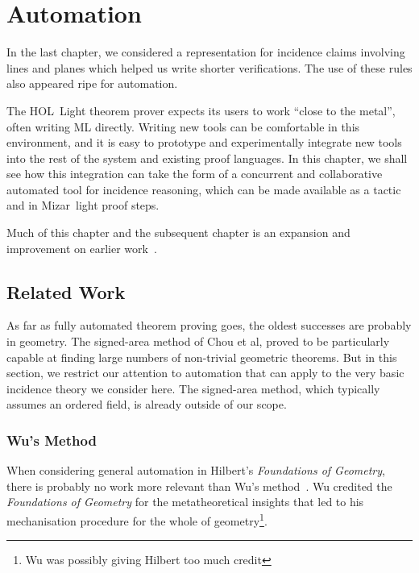 \chapter{Automation}\label{chapter:Automation}
In the last chapter, we considered a representation for incidence claims involving lines and planes which helped us write shorter verifications. The use of these rules also appeared ripe for automation. 

The HOL~Light theorem prover expects its users to work ``close to the metal'', often writing ML directly. Writing new tools can be comfortable in this environment, and it is easy to prototype and experimentally integrate new tools into the rest of the system and existing proof languages. In this chapter, we shall see how this integration can take the form of a concurrent and collaborative automated tool for incidence reasoning, which can be made available as a tactic and in Mizar~light proof steps.

Much of this chapter and the subsequent chapter is an expansion and improvement on earlier work~\cite{ScottExploring,ScottComposable}.

\section{Related Work}
As far as fully automated theorem proving goes, the oldest successes are probably in geometry. The signed-area method \cite{MachineProofsInGeometry} of Chou et al, proved to be particularly capable at finding large numbers of non-trivial geometric theorems. But in this section, we restrict our attention to automation that can apply to the very basic incidence theory we consider here. The signed-area method, which typically assumes an ordered field, is already outside of our scope.

\subsection{Wu's Method}
When considering general automation in Hilbert's \emph{Foundations of Geometry}, there is probably no work more relevant than Wu's method~\cite{WuMechanicalTheoremProving}. Wu credited the \emph{Foundations of Geometry} for the metatheoretical insights that led to his mechanisation procedure for the whole of geometry\footnote{Wu was possibly giving Hilbert too much credit}.

